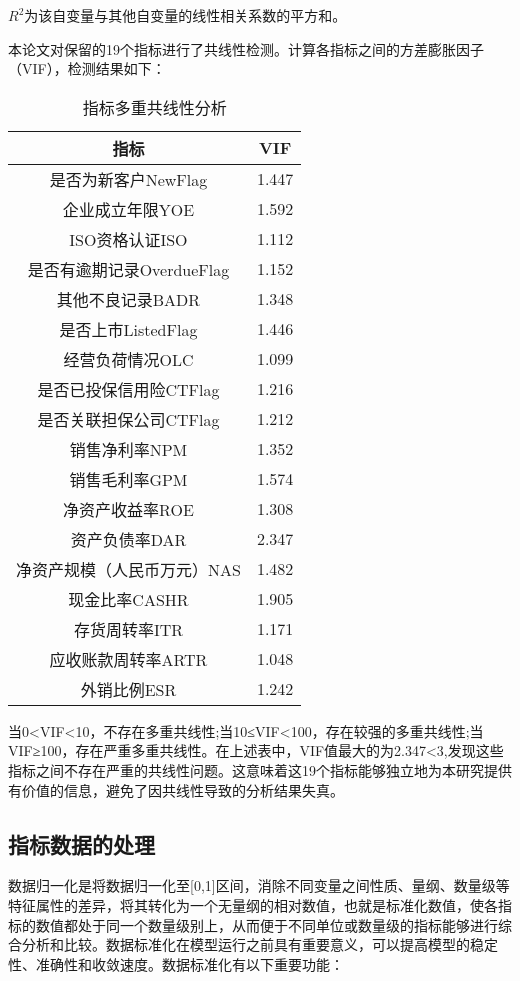 $R^2$为该自变量与其他自变量的线性相关系数的平方和。

本论文对保留的19个指标进行了共线性检测。计算各指标之间的方差膨胀因子（VIF），检测结果如下：
\begin{table}[h]
	\caption{指标多重共线性分析}
	\label{tab:papercomponents}
	\centering
	\begin{tabular}{cc}
		\toprule
		指标 & VIF \\
		\midrule
		是否为新客户NewFlag	&	1.447	\\
		企业成立年限YOE	&	1.592	\\
		ISO资格认证ISO	&	1.112	\\
		是否有逾期记录OverdueFlag	&	1.152	\\
		其他不良记录BADR	&	1.348	\\
		是否上市ListedFlag	&	1.446	\\
		经营负荷情况OLC	&	1.099	\\
		是否已投保信用险CTFlag	&	1.216	\\
		是否关联担保公司CTFlag	&	1.212	\\
		销售净利率NPM	&	1.352	\\
		销售毛利率GPM	&	1.574	\\
		净资产收益率ROE	&	1.308	\\
		资产负债率DAR	&	2.347	\\
		净资产规模（人民币万元）NAS	&	1.482	\\
		现金比率CASHR	&	1.905	\\
		存货周转率ITR	&	1.171	\\
		应收账款周转率ARTR	&	1.048	\\
		外销比例ESR	&	1.242	\\
		\bottomrule
	\end{tabular}
\end{table}

当0<VIF<10，不存在多重共线性;当10≤VIF<100，存在较强的多重共线性;当VIF≥100，存在严重多重共线性。在上述表中，VIF值最大的为2.347<3,发现这些指标之间不存在严重的共线性问题。这意味着这19个指标能够独立地为本研究提供有价值的信息，避免了因共线性导致的分析结果失真。

\subsection{指标数据的处理}
数据归一化是将数据归一化至[0,1]区间，消除不同变量之间性质、量纲、数量级等特征属性的差异，将其转化为一个无量纲的相对数值，也就是标准化数值，使各指标的数值都处于同一个数量级别上，从而便于不同单位或数量级的指标能够进行综合分析和比较。数据标准化在模型运行之前具有重要意义，可以提高模型的稳定性、准确性和收敛速度。数据标准化有以下重要功能：

